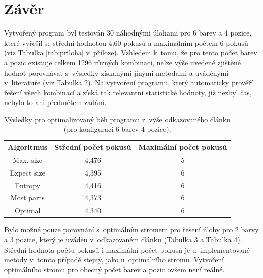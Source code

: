 \documentclass[12pt, a4paper]{article}
\begin{document}
\newpage
\section{Závěr}  %


Vytvořený program byl testován 30 náhodnými úlohami pro 6 barev a 4 pozice, které vyřešil se střední hodnotou 4,60 pokusů a maximálním počtem   6 pokusů (viz Tabulka \ref{tab:priloha} v~příloze). Vzhledem k~tomu, že pro tento počet barev a pozic existuje celkem 1296 různých kombinací, nelze výše uvedené zjištěné hodnot porovnávat s~výsledky získanými jinými metodami a uváděnými v~literatuře (viz Tabulka 2). Na vytvoření programu, který automaticky prověří řešení všech kombinací a získá tak relevantní statistické hodnoty, již nezbyl čas, nebylo to ani předmětem zadání.

\begin{table}[ht]
\begin{tabular}{c | c | c}

Algoritmus & Střední počet pokusů  & Maximální počet pokusů\\
\hline
Max. size  	&   4,476 &  5\\
Expect size	 &4,395   & 6\\
Entropy      &  4,416  & 6\\
Most parts   &   4,373 &  6\\
Optimal      &   4.340 &  6\\

\end{tabular}
\label{tab:data}
\caption{Výsledky pro optimalizovaný běh programu z~výše odkazovaného článku (pro konfiguraci 6 barev 4 pozice).}
\end{table}
		
Bylo možné pouze porovnání s~optimálním stromem pro řešení úlohy pro 2 barvy a 3 pozice, který je uváděn v~odkazovaném článku (Tabulka 3 a Tabulka 4). Střední hodnota počtu pokusů i maximální počet pokusů je u~implementované metody v~tomto případě stejný, jako u~optimálního stromu. Vytvoření optimálního stromu pro obecný počet barev a pozic ovšem není reálné.
\end{document}
